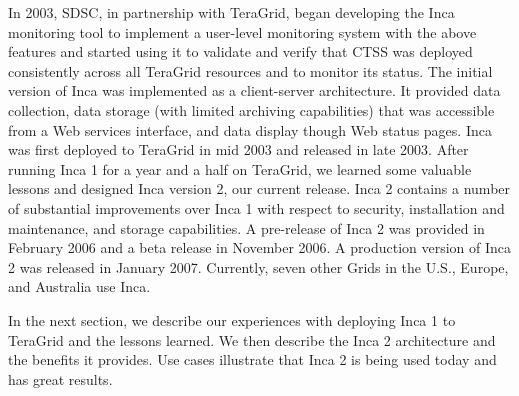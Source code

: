\documentclass[times, 10pt,twocolumn]{article}
\begin{document}
In 2003, SDSC, in partnership with TeraGrid, began developing the Inca
monitoring tool to implement a user-level monitoring system with the above
features and started using it to validate and verify that CTSS was deployed
consistently across all TeraGrid resources and to monitor its status.  
The initial version of Inca was implemented as a client-server architecture.
It provided data collection, data storage (with limited archiving
capabilities) that was accessible from a Web services interface, and data
display though Web status pages.  Inca was first deployed to TeraGrid in mid
2003 and released in late 2003. After running Inca 1 for a year and a half on
TeraGrid, we learned some valuable lessons and designed Inca version 2, our
current release.  Inca 2 contains a number of substantial improvements over
Inca 1 with respect to security, installation and maintenance, and storage
capabilities.  A pre-release of Inca 2 was provided in February 2006 and a
beta release in November 2006.  A production version of Inca 2 was released in
January 2007.  Currently, seven other Grids in the U.S., Europe, and Australia
use Inca.  

In the next section, we describe our experiences with deploying Inca 1 to
TeraGrid and the lessons learned.  We then describe the Inca 2 architecture
and the benefits it provides.  Use cases illustrate that Inca 2 is being used
today and has great results.

  
\end{document}
